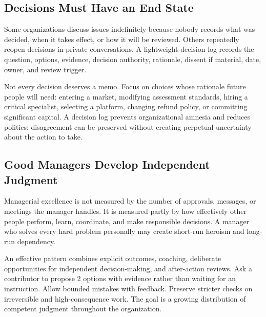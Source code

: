 \subsection{Decisions Must Have an End State}
\label{sec:decisions_end_state}

Some organizations discuss issues indefinitely because nobody records what was decided, when it takes effect, or how it will be reviewed. Others repeatedly reopen decisions in private conversations. A lightweight decision log records the question, options, evidence, decision authority, rationale, dissent if material, date, owner, and review trigger.

Not every decision deserves a memo. Focus on choices whose rationale future people will need: entering a market, modifying assessment standards, hiring a critical specialist, selecting a platform, changing refund policy, or committing significant capital. A decision log prevents organizational amnesia and reduces politics: disagreement can be preserved without creating perpetual uncertainty about the action to take.

\subsection{Good Managers Develop Independent Judgment}
\label{sec:good_managers_develop_judgment}

Managerial excellence is not measured by the number of approvals, messages, or meetings the manager handles. It is measured partly by how effectively other people perform, learn, coordinate, and make responsible decisions. A manager who solves every hard problem personally may create short-run heroism and long-run dependency.

An effective pattern combines explicit outcomes, coaching, deliberate opportunities for independent decision-making, and after-action reviews. Ask a contributor to propose 2 options with evidence rather than waiting for an instruction. Allow bounded mistakes with feedback. Preserve stricter checks on irreversible and high-consequence work. The goal is a growing distribution of competent judgment throughout the organization.
